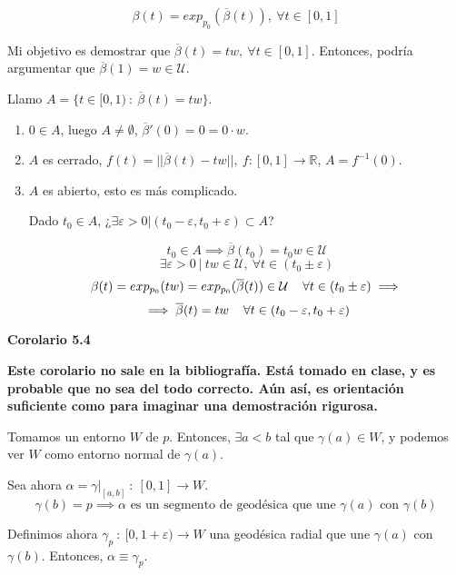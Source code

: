 \documentclass[openany]{book}
\begin{document}
\begin{demonstration}
  $$ \beta (t) = exp_{p_0}(\overline{\beta }(t)) , \ \forall t \in [0,1] $$

  Mi objetivo es demostrar que $\overline{\beta }(t) = tw, \ \forall t \in [0,1]$. Entonces, podría argumentar que $\overline{\beta }(1) = w \in \mathcal{U}$.

  Llamo $A= \{ t \in [0,1) \ : \  \overline{\beta }(t) = tw  \}$.
    \begin{enumerate}
      \item $0 \in A$, luego $A \ne \emptyset$, $\overline{\beta}'(0) = 0=0 \cdot w$.
      \item $A$ es cerrado, $f(t) = ||\overline{\beta }(t) - tw || , \ f:[0,1] \to \mathbb{R}$, $A= f ^{-1} (0)$.
      \item $A$ es abierto, esto es más complicado.

      Dado $t_0 \in A$, ¿$\exists \varepsilon >0 | (t_0 - \varepsilon , t_0 + \varepsilon ) \subset A$?

      $$ t_0 \in A \implies \overline{\beta }(t_0) = t_0 w \in \mathcal{U} $$
      $$ \exists \varepsilon >0 \ | \ tw \in \mathcal{U} , \ \forall t \in (t_0 \pm \varepsilon )$$
      $$ \beta (t) = exp_{p_0}(tw) = exp_{p_0}(\overline{\beta }(t))\in \mathcal{U} \hspace{0.4cm} \forall t \in (t_0 \pm \varepsilon ) \implies $$
      $$ \implies \overline{\beta }(t) = tw \hspace{0.4cm} \forall t \in (t_0 - \varepsilon , t_0 + \varepsilon )  $$
    \end{enumerate}
\end{demonstration}


\begin{center}
\textbf{Corolario 5.4}
\end{center}

\textbf{Este corolario no sale en la bibliografía. Está tomado en clase, y es probable que no sea del todo correcto. Aún así, es orientación suficiente como para imaginar una demostración rigurosa.}

\begin{demonstration}
  Tomamos un entorno $W$ de $p$. Entonces, $\exists a < b$ tal que $\gamma (a) \in W$, y podemos ver $W$ como entorno normal de $\gamma (a)$.

  Sea ahora $\alpha = \gamma |_{[a,b]} \ : \ [0,1] \to W$.
  $$ \gamma (b) = p \implies \alpha \text{ es un segmento de geodésica que une }\gamma (a) \text{ con }\gamma (b) $$

  Definimos ahora $\gamma _p \ : \ [0, 1+\varepsilon ) \to W$ una geodésica radial que une $\gamma (a)$ con $\gamma (b)$. Entonces, $\alpha \equiv \gamma _p$.
\end{demonstration}
\end{document}
